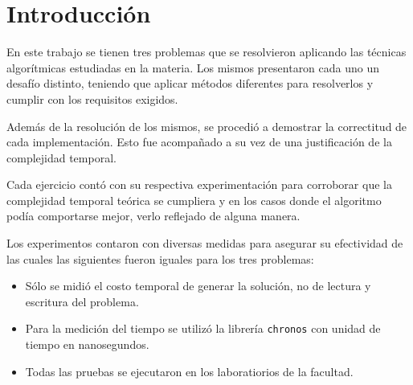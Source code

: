 \section{Introducción}

En este trabajo se tienen tres problemas que se resolvieron aplicando las
técnicas algorítmicas estudiadas en la materia. Los mismos presentaron cada uno un desafío
distinto, teniendo que aplicar métodos diferentes para resolverlos y cumplir
con los requisitos exigidos.

Además de la resolución de los mismos, se procedió a demostrar la correctitud de
cada implementación. Esto fue acompañado a su vez de una justificación de la
complejidad temporal.

Cada ejercicio contó con su respectiva experimentación para corroborar que la
complejidad temporal teórica se cumpliera y en los casos donde el algoritmo
podía comportarse mejor, verlo reflejado de alguna manera.

Los experimentos contaron con diversas medidas para asegurar su efectividad de
las cuales las siguientes fueron iguales para los tres problemas:
\begin{itemize}
	\item{Sólo se midió el costo temporal de generar la solución, no
			de lectura y escritura del problema.}
	\item{Para la medición del tiempo se utilizó la librería \texttt{chronos}
			con unidad de tiempo en nanosegundos.}
	\item{Todas las pruebas se ejecutaron en los laboratiorios de la facultad.}
\end{itemize}
